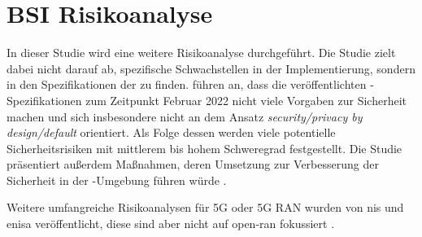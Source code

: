 \section{BSI Risikoanalyse}
\label{sec:forschungsstand-bsi}
In dieser Studie wird eine weitere Risikoanalyse durchgeführt. Die Studie zielt dabei nicht darauf ab, spezifische Schwachstellen in der Implementierung, sondern in den Spezifikationen der \orana zu finden. \citeauthor{kopsellOpenRANRisikoanalyse2022} führen an, dass die veröffentlichten \oran-Spezifikationen zum Zeitpunkt Februar 2022 nicht viele Vorgaben zur Sicherheit machen und sich insbesondere nicht an dem Ansatz \textit{security/privacy by design/default} orientiert. Als Folge dessen werden viele potentielle Sicherheitsrisiken mit mittlerem bis hohem Schweregrad festgestellt. Die Studie präsentiert außerdem Maßnahmen, deren Umsetzung zur Verbesserung der Sicherheit in der \oran-Umgebung führen würde \autocite{kopsellOpenRANRisikoanalyse2022}.
\par Weitere umfangreiche Risikoanalysen für 5G oder 5G RAN wurden von \gls{nis} und \gls{enisa} veröffentlicht, diese sind aber nicht auf \gls{open-ran} fokussiert \autocite{europeanunionagencyfornetworkandinformationsecurity.ENISAThreatLandscape2019} \autocite{EUCoordinatedRisk}.
%
